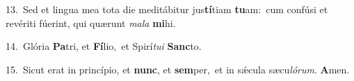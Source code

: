 {\numbfont\textcolor{\numbcolor}{13.}}~Sed et lingua mea tota die meditábitur jus\-\textbf{tí}\-tiam \textbf{tu}\-am:~\star cum confúsi et revériti fúerint, qui quærunt \textit{ma}\-\textit{la} \textbf{mi}\-hi.\par
{\numbfont\textcolor{\numbcolor}{14.}}~Glória \textbf{Pa}\-tri, et \textbf{Fí}\-lio,~\star et Spirí\-\textit{tu}\-\textit{i} \textbf{Sanc}\-to.\par
{\numbfont\textcolor{\numbcolor}{15.}}~Sicut erat in princípio, et \textbf{nunc}\-, et \textbf{sem}\-per,~\star et in sǽcula sæcu\-\textit{ló}\-\textit{rum}. \textbf{A}\-men.\par

